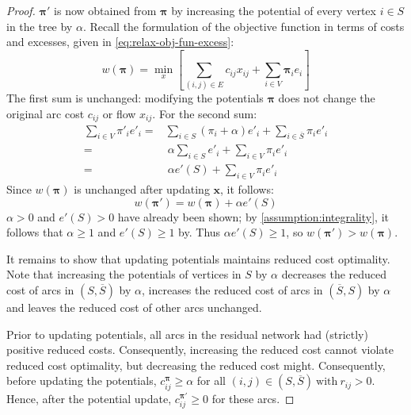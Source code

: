 \begin{proof}
$\boldsymbol{\pi}'$ is now obtained from $\boldsymbol{\pi}$ by increasing the potential of every vertex $i \in S$ in the tree by $\alpha$. Recall the formulation of the objective function in terms of costs and excesses, given in \cref{eq:relax-obj-fun-excess}:
\[w\left(\boldsymbol{\pi}\right)=\min_{x}\left[\sum_{\left(i,j\right)\in E}c_{ij}x_{ij}+\sum_{i\in V}\boldsymbol{\pi}_{i}e_{i}\right]\]
The first sum is unchanged: modifying the potentials $\boldsymbol{\pi}$ does not change the original arc cost $c_{ij}$ or flow $x_{ij}$. For the second sum:
\begin{align*}
\sum_{i\in V}\pi'_{i}e'_{i}= & \sum_{i\in S}\left(\pi_{i}+\alpha\right)e'_{i}+\sum_{i\in\overline{S}}\pi_{i}e'_{i}\\
= &\:\alpha\sum_{i\in S}e'_{i}+\sum_{i\in V}\pi_{i}e'_{i}\\
= &\:\alpha e'(S)+\sum_{i\in V}\pi_{i}e'_{i}
\end{align*}
Since $w\left(\boldsymbol{\pi}\right)$ is unchanged after updating $\mathbf{x}$, it follows:
\[w\left(\boldsymbol{\pi}'\right)=w(\boldsymbol{\pi})+\alpha e'(S)\]
$\alpha > 0$ and $e'(S) > 0$ have already been shown; by \cref{assumption:integrality}, it follows that $\alpha \geq 1 $ and $e'(S) \geq 1$ by. Thus $\alpha e'(S) \geq 1$, so $w\left(\boldsymbol{\pi}'\right) > w\left(\boldsymbol{\pi}\right)$.

It remains to show that updating potentials maintains reduced cost optimality. Note that increasing the potentials of vertices in $S$ by $\alpha$ decreases the reduced cost of arcs in $\left(S,\overline{S}\right)$ by $\alpha$, increases the reduced cost of arcs in $\left(\overline{S},S\right)$ by $\alpha$ and leaves the reduced cost of other arcs unchanged.

Prior to updating potentials, all arcs in the residual network had (strictly) positive reduced costs. Consequently, increasing the reduced cost cannot violate reduced cost optimality\footnotemark, but decreasing the reduced cost might. Consequently, before updating the potentials, $c_{ij}^{\boldsymbol{\pi}} \geq \alpha$ for all $(i,j)\in\left(S,\overline{S}\right)\:\mbox{with}\:r_{ij}>0$. Hence, after the potential update, $c_{ij}^{\boldsymbol{\pi}'}\geq 0$ for these arcs.
\end{proof}

